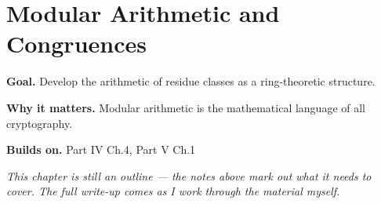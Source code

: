 \chapter{Modular Arithmetic and Congruences}
\label{ch:05-number-theory-02}

\begin{chapterintro}
\textbf{Goal.} Develop the arithmetic of residue classes as a ring-theoretic structure.

\textbf{Why it matters.} Modular arithmetic is the mathematical language of all cryptography.

\textbf{Builds on.} Part IV Ch.4, Part V Ch.1
\end{chapterintro}

\textit{This chapter is still an outline --- the notes above mark out what it needs to cover. The full write-up comes as I work through the material myself.}
